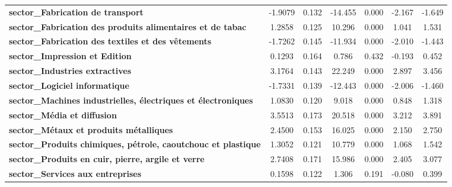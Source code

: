 \begin{center}
\begin{tabular}{lcccccc}
\textbf{sector\_Fabrication de transport}                             &      -1.9079  &        0.132     &   -14.455  &         0.000        &       -2.167    &       -1.649     \\
\textbf{sector\_Fabrication des produits alimentaires et de tabac}    &       1.2858  &        0.125     &    10.296  &         0.000        &        1.041    &        1.531     \\
\textbf{sector\_Fabrication des textiles et des vêtements}            &      -1.7262  &        0.145     &   -11.934  &         0.000        &       -2.010    &       -1.443     \\
\textbf{sector\_Impression et Edition}                                &       0.1293  &        0.164     &     0.786  &         0.432        &       -0.193    &        0.452     \\
\textbf{sector\_Industries extractives}                               &       3.1764  &        0.143     &    22.249  &         0.000        &        2.897    &        3.456     \\
\textbf{sector\_Logiciel informatique}                                &      -1.7331  &        0.139     &   -12.443  &         0.000        &       -2.006    &       -1.460     \\
\textbf{sector\_Machines industrielles, électriques et électroniques} &       1.0830  &        0.120     &     9.018  &         0.000        &        0.848    &        1.318     \\
\textbf{sector\_Média et diffusion}                                   &       3.5513  &        0.173     &    20.518  &         0.000        &        3.212    &        3.891     \\
\textbf{sector\_Métaux et produits métalliques}                       &       2.4500  &        0.153     &    16.025  &         0.000        &        2.150    &        2.750     \\
\textbf{sector\_Produits chimiques, pétrole, caoutchouc et plastique} &       1.3052  &        0.121     &    10.779  &         0.000        &        1.068    &        1.542     \\
\textbf{sector\_Produits en cuir, pierre, argile et verre}            &       2.7408  &        0.171     &    15.986  &         0.000        &        2.405    &        3.077     \\
\textbf{sector\_Services aux entreprises}                             &       0.1598  &        0.122     &     1.306  &         0.191        &       -0.080    &        0.399     \\

\end{tabular}
\end{center}
